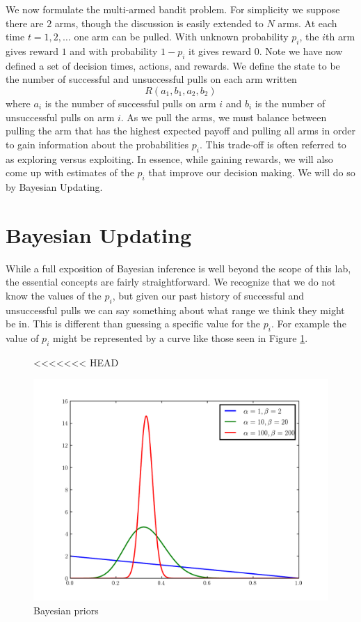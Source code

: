 We now formulate the multi-armed bandit problem.  
For simplicity we suppose there are $2$ arms, though the 
discussion is easily extended to $N$ arms.  
At each time $t= 1,2,\ldots$ one arm can be pulled.  
With unknown probability $p_i$, the $i$th arm gives 
reward $1$ and with probability $1-p_i$ it gives reward $0$.  
Note we have now defined a set of decision times, actions, and rewards. 
We define the state to be the number of successful and unsuccessful 
pulls on each arm written
\begin{equation}\label{state}
R(a_1,b_1,a_2,b_2)
\end{equation}
where $a_i$ is the number of successful pulls on arm $i$ and $b_i$ 
is the number of unsuccessful pulls on arm $i$.
As we pull the arms, we must balance between pulling the arm that has 
the highest expected payoff and pulling all arms in order to gain 
information about the probabilities $p_i$.  
This trade-off is often referred to as exploring versus exploiting.  
In essence, while gaining rewards, we will also come up with 
estimates of the $p_i$ that improve our decision making.  
We will do so by Bayesian Updating.

\section*{Bayesian Updating}
While a full exposition of Bayesian inference is well beyond the 
scope of this lab, the essential concepts are fairly straightforward.  
We recognize that we do not know the values of the $p_i$, 
but given our past history of successful and unsuccessful 
pulls we can say something about what range we think they might be in. 
This is different than guessing a specific value for the $p_i$.
For example the value of $p_i$ might be represented by a curve 
like those seen in Figure \ref{fig:priors}.
\begin{figure}
<<<<<<< HEAD
\begin{center}
        \includegraphics[width=\textwidth]{./Algorithms/MarkDecProc/priors.pdf}
        \caption{Bayesian priors}
				\label{fig:priors}
\end{center}
\end{figure}

